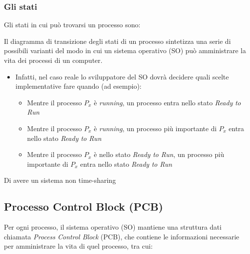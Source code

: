 \subsubsection{Gli stati}
Gli stati in cui può trovarsi un processo sono:

Il diagramma di transizione degli stati di un processo sintetizza una serie di possibili varianti del modo in cui un sistema operativo (SO) può amministrare la vita dei processi di un computer.

\begin{itemize}
    \item Infatti, nel caso reale lo sviluppatore del SO dovrà decidere quali scelte implementative fare quando (ad esempio):
    \begin{itemize}
        \item Mentre il processo \(P_x\) è \textit{running}, un processo entra nello stato \textit{Ready to Run}
        \item Mentre il processo \(P_x\) è \textit{running}, un processo più importante di \(P_x\) entra nello stato \textit{Ready to Run}
        \item Mentre il processo \(P_x\) è nello stato \textit{Ready to Run}, un processo più importante di \(P_x\) entra nello stato \textit{Ready to Run}
    \end{itemize}
\end{itemize}


Di avere un sistema non time-sharing

\subsection{Processo Control Block (PCB)}
Per ogni processo, il sistema operativo (SO) mantiene una struttura dati chiamata \textit{Process Control Block} (PCB), che contiene le informazioni necessarie per amministrare la vita di quel processo, tra cui:

